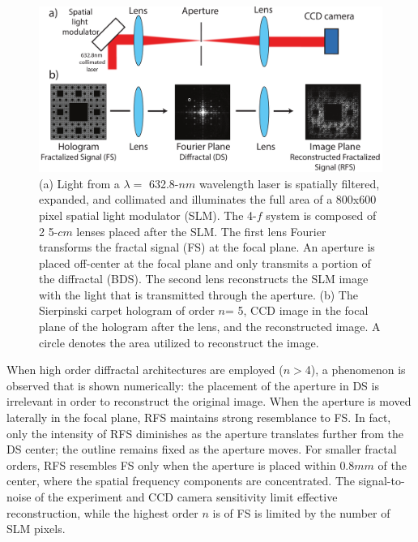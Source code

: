 \begin{figure}[t!]
\includegraphics[width=\textwidth]{ExpMethod.pdf}
\caption{(a) Light from a $\lambda = $ 632.8-$nm$ wavelength laser is spatially filtered, expanded, and collimated and illuminates the full area of a 800x600 pixel spatial light modulator (SLM). The 4-$f$ system is composed of 2 5-$cm$ lenses placed after the SLM. The first lens Fourier transforms the fractal signal (FS) at the focal plane. An aperture is placed off-center at the focal plane and only transmits a portion of the diffractal (BDS). The second lens reconstructs the SLM image with the light that is transmitted through the aperture. (b) The Sierpinski carpet hologram of order $n$= 5, CCD image in the focal plane of the hologram after the lens, and the reconstructed image. A circle denotes the area utilized to reconstruct the image.}
\label{ExpSetup}
\end{figure}

When high order diffractal architectures are employed ($n>$4), a phenomenon is observed that is shown numerically: the placement of the aperture in DS is irrelevant in order to reconstruct the original image. When the aperture is moved laterally in the focal plane, RFS maintains strong resemblance to FS. In fact, only the intensity of RFS diminishes as the aperture translates further from the DS center; the outline remains fixed as the aperture moves.  For smaller fractal orders, RFS resembles FS only when the aperture is placed within $0.8mm$ of the center, where the spatial frequency components are concentrated. The signal-to-noise of the experiment and CCD camera sensitivity limit effective reconstruction, while the highest order $n$ is of FS is limited by the number of SLM pixels.  

